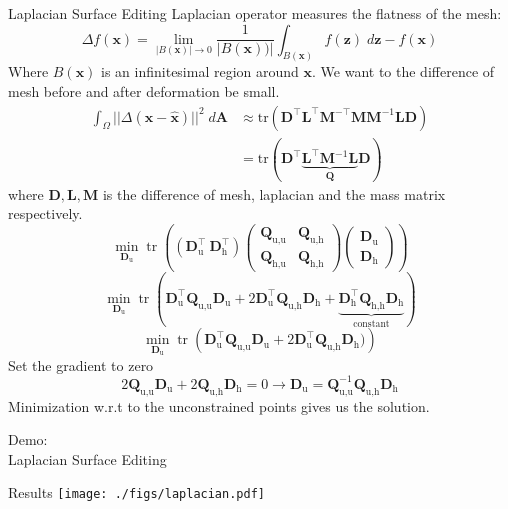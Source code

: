 \documentclass{beamer}
\newcommand{\D}{\mathbf{D}}
\newcommand{\Q}{\mathbf{Q}}
\DeclareMathOperator{\tr}{tr}
\begin{document}
\begin{frame}[allowframebreaks]{Laplacian Surface Editing}
Laplacian operator measures the flatness of the mesh:
$$\Delta f(\mathbf{x}) = \lim_{|B(\mathbf{x})| \rightarrow 0} \frac{1}{|B(\mathbf{x}))|} \int_{B(\mathbf{x})} f(\mathbf{z}) \;d\mathbf{z} - f(\mathbf{x})$$
Where $B(\mathbf{x})$ is an infinitesimal region around $\mathbf{x}$.
We want to the difference of mesh before and after deformation be small.  
\begin{align*}
\int_\Omega ||\Delta(\mathbf{x} - \hat{\mathbf{x}})||^2 \; d\mathbf{A} & \approx \text{tr}( \mathbf{D}^\top \mathbf{L}^\top \mathbf{M}^{-\top} \mathbf{M} \mathbf{M}^{-1} \mathbf{L}\mathbf{D})\\
&= \text{tr}(  \mathbf{D}^\top \underbrace{\mathbf{L}^\top \mathbf{M}^{-1} \mathbf{L}}_{\Q} \mathbf{D})
\end{align*}
where $\mathbf{D}, \mathbf{L}, \mathbf{M}$ is the difference of mesh, laplacian and the mass matrix respectively. 
$$
\min_{\D_\text{u}}
\tr \left((\D_\text{u}^\top \ \D_\text{h}^\top)
\left(\begin{array}{cc}
\Q_\text{u,u} & \Q_\text{u,h} \\
\Q_\text{h,u} & \Q_\text{h,h} 
\end{array}\right)
\left(\begin{array}{c}
  \D_\text{u} \\
  \D_\text{h}
\end{array}
\right)\right)
$$
$$
\min_{\D_\text{u}}
\tr\left(\D_\text{u}^\top \Q_\text{u,u} \D_\text{u} +
2 \D_\text{u}^\top \Q_\text{u,h} \D_\text{h} + 
\underbrace{\D_\text{h}^\top \Q_\text{h,h}
\D_\text{h}}_\text{constant}\right)
$$
$$
\min_{\D_\text{u}} 
\tr\left(
\D_\text{u}^\top \Q_\text{u,u} \D_\text{u} +
2 \D_\text{u}^\top \Q_\text{u,h} \D_\text{h})
\right)
$$
Set the gradient to zero
$$2 \Q_\text{u,u} \D_\text{u} + 2 \Q_\text{u,h} \D_\text{h} = 0 \rightarrow \D_\text{u} = \Q_\text{u,u}^{-1} \Q_\text{u,h} \D_\text{h}$$
Minimization w.r.t to the unconstrained points gives us the solution.
\end{frame}
\begin{frame}
\begin{center}
\Huge Demo: \\Laplacian Surface Editing
\end{center}
\end{frame}
\begin{frame}{Results}
    \texttt{[image: ./figs/laplacian.pdf]}
\end{frame}
\end{document}
